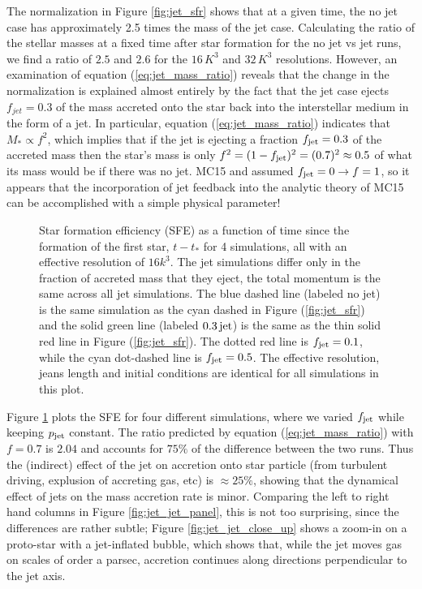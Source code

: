 \documentclass[../dissertation.tex]{subfiles}
\begin{document}
The normalization in Figure \ref{fig:jet_sfr} shows that at a given time, the no jet case has approximately 2.5 times the mass of the jet case.
Calculating the ratio of the stellar masses at a fixed time after star formation for the no jet vs jet runs, we find a ratio of $2.5$ and $2.6$ for the $16 \, K^3$ and $32 \, K^3$ resolutions.
However, an examination of equation (\ref{eq:jet_mass_ratio}) reveals that the change in the normalization is explained almost entirely by the fact that the jet case ejects $f_{jet} = 0.3$ of the mass accreted onto the star back into the interstellar medium in the form of a jet.
In particular, equation (\ref{eq:jet_mass_ratio}) indicates that $M_* \propto f^2$, which implies that if the jet is ejecting a fraction $f_{\rm jet} = 0.3$ of the accreted mass then the star's mass is only $f^2 = (1-f_{\rm jet})^2 = (0.7)^2 \approx 0.5$ of what its mass would be if there was no jet.
MC15 and \citet{2017MNRAS.465.1316M} assumed $f_{\rm jet} = 0 \rightarrow f = 1$, so it appears that the incorporation of jet feedback into the analytic theory of MC15 can be accomplished with a simple physical parameter!

\begin{figure}[htb]%
  \caption[Jet - SFR varying $f_{\rm jet}$]{Star formation efficiency (SFE) as a function of time since the formation of the first star, $t-t_*$ for 4 simulations, all with an effective resolution of $16k^3$. The jet simulations differ only in the fraction of accreted mass that they eject, the total momentum is the same across all jet simulations. The blue dashed line (labeled no jet) is the same simulation as the cyan dashed in Figure (\ref{fig:jet_sfr}) and the solid green line (labeled $0.3 {\rm \, jet}$) is the same as the thin solid red line in Figure (\ref{fig:jet_sfr}). The dotted red line is $f_{\rm jet} = 0.1$, while the cyan dot-dashed line is $f_{\rm jet} = 0.5$. The effective resolution, jeans length and initial conditions are identical for all simulations in this plot. %
}
  \label{fig:jet_f_jet}
\end{figure}

Figure \ref{fig:jet_f_jet} plots the SFE for four different simulations, where we varied $f_{\rm jet}$ while keeping $p_{\rm jet}$ constant.
The ratio predicted by equation (\ref{eq:jet_mass_ratio}) with $f = 0.7$ is $2.04$ and accounts for $75 \%$ of the difference between the two runs.
Thus the (indirect) effect of the jet on accretion onto star particle (from turbulent driving, explusion of accreting gas, etc) is $\approx 25 \%$, showing that the dynamical effect of jets on the mass accretion rate is minor.
Comparing the left to right hand columns in Figure \ref{fig:jet_jet_panel}, this is not too surprising, since the differences are rather subtle; Figure \ref{fig:jet_jet_close_up} shows a zoom-in on a proto-star with a jet-inflated bubble, which shows that, while the jet moves gas on scales of order a parsec, accretion continues along directions perpendicular to the jet axis.
\end{document}
